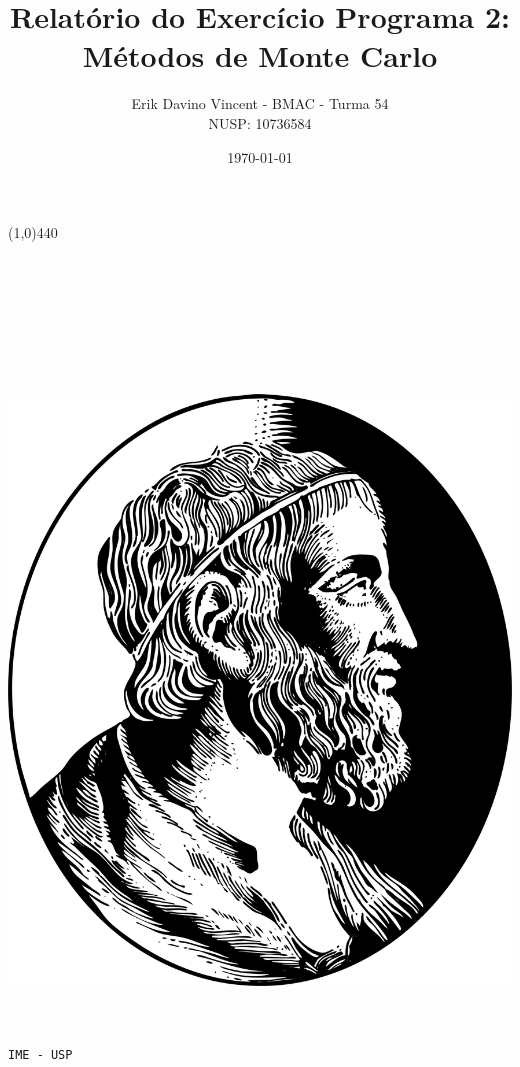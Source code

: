 \documentclass[pt12]{article}
\begin{document}
\begin{titlepage}

\title{\textbf{Relatório do Exercício Programa 2: \\ Métodos de Monte Carlo}}
\author{Erik Davino Vincent - BMAC - Turma 54 \\ NUSP: 10736584}
\date{\today}
\maketitle
\line(1,0){440}
\ \\
\ \\
\ \\
\ \\
\ \\
\ \\
\ \\
\ \\
\begin{center}

\includegraphics[scale=0.1]{ime.png}\\
\ \\
\ \\
\begin{LARGE}\tt{IME - USP} \end{LARGE}


\end{center}

\end{titlepage}
\end{document}
